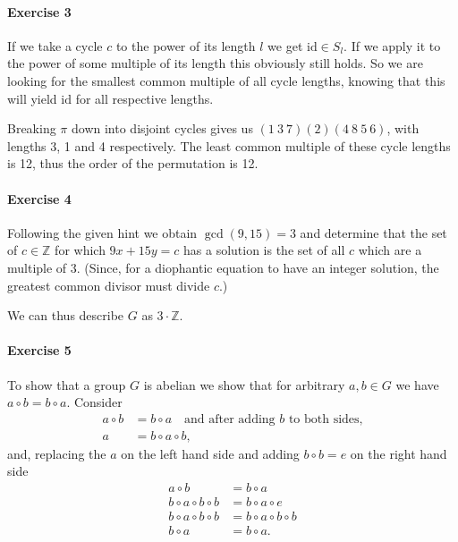\documentclass{article}
\newcommand{\id}{\text{id}}
\begin{document}
\paragraph{Exercise 3}

If we take a cycle $c$ to the power of its length $l$ we get $\id \in S_{l}$. If we apply it to the power of some multiple of its length this obviously still holds. So we are looking for the smallest common multiple of all cycle lengths, knowing that this will yield $\id$ for all respective lengths.

Breaking $\pi$ down into disjoint cycles gives us $(1\ 3\ 7)(2)(4\ 8\ 5\ 6)$, with lengths 3, 1 and 4 respectively. The least common multiple of these cycle lengths is 12, thus the order of the permutation is 12.

\paragraph{Exercise 4}

Following the given hint we obtain $\gcd(9, 15) = 3$ and determine that the set of $c \in \mathbb{Z}$ for which $9x + 15y = c$ has a solution is the set of all $c$ which are a multiple of 3. (Since, for a diophantic equation to have an integer solution, the greatest common divisor must divide $c$.)

We can thus describe $G$ as $3 \cdot \mathbb{Z}$.

\paragraph{Exercise 5}

To show that a group $G$ is abelian we show that for arbitrary $a, b \in G$ we have $a \circ b = b \circ a$. Consider
\begin{align*}
    a \circ b &= b \circ a \quad \text{and after adding $b$ to both sides,}\\
    a &= b \circ a \circ b,
\end{align*}
and, replacing the $a$ on the left hand side and adding $b \circ b = e$ on the right hand side
\begin{align*}
    a \circ b &= b \circ a \\
    b \circ a \circ b \circ b &= b \circ a \circ e \\
    b \circ a \circ b \circ b &= b \circ a \circ b \circ b \\
    b \circ a &= b \circ a.
\end{align*}
\end{document}
